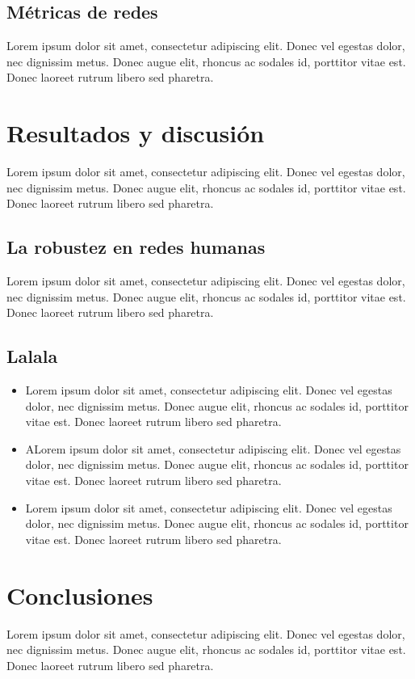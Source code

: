 \documentclass[conference]{IEEEtran}
\begin{document}
\subsection{Métricas de redes}
Lorem ipsum dolor sit amet, consectetur adipiscing elit. Donec vel egestas dolor, nec dignissim metus. Donec augue elit, rhoncus ac sodales id, porttitor vitae est. Donec laoreet rutrum libero sed pharetra.
\section{Resultados y discusión}
Lorem ipsum dolor sit amet, consectetur adipiscing elit. Donec vel egestas dolor, nec dignissim metus. Donec augue elit, rhoncus ac sodales id, porttitor vitae est. Donec laoreet rutrum libero sed pharetra.
\subsection{La robustez en redes humanas}
Lorem ipsum dolor sit amet, consectetur adipiscing elit. Donec vel egestas dolor, nec dignissim metus. Donec augue elit, rhoncus ac sodales id, porttitor vitae est. Donec laoreet rutrum libero sed pharetra.
\subsection{Lalala}
\begin{itemize}
\item Lorem ipsum dolor sit amet, consectetur adipiscing elit. Donec vel egestas dolor, nec dignissim metus. Donec augue elit, rhoncus ac sodales id, porttitor vitae est. Donec laoreet rutrum libero sed pharetra.
\item ALorem ipsum dolor sit amet, consectetur adipiscing elit. Donec vel egestas dolor, nec dignissim metus. Donec augue elit, rhoncus ac sodales id, porttitor vitae est. Donec laoreet rutrum libero sed pharetra.
\item Lorem ipsum dolor sit amet, consectetur adipiscing elit. Donec vel egestas dolor, nec dignissim metus. Donec augue elit, rhoncus ac sodales id, porttitor vitae est. Donec laoreet rutrum libero sed pharetra.
\end{itemize}

\section{Conclusiones}
Lorem ipsum dolor sit amet, consectetur adipiscing elit. Donec vel egestas dolor, nec dignissim metus. Donec augue elit, rhoncus ac sodales id, porttitor vitae est. Donec laoreet rutrum libero sed pharetra.
\end{document}
